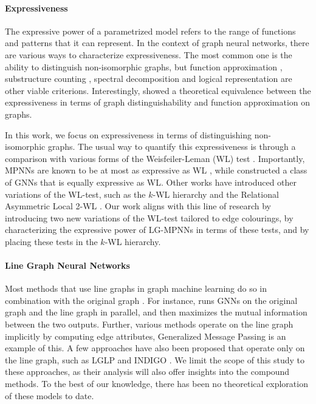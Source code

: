 \documentclass{article}
\begin{document}
\paragraph{Expressiveness}
The expressive power of a parametrized model refers to the range of functions and patterns that it can represent. 
In the context of graph neural networks, there are various ways to characterize expressiveness. The most common one is the ability to distinguish non-isomorphic graphs, but function approximation \cite{maron2019universality}, substructure counting \cite{chen2020can}, spectral decomposition \cite{balcilar2020analyzing} and logical representation \cite{barcelo2020logical} are other viable criterions. Interestingly, \cite{chen2019equivalence} showed a theoretical equivalence between the expressiveness in terms of graph distinguishability and function approximation on graphs.

In this work, we focus on expressiveness in terms of distinguishing non-isomorphic graphs.
The usual way to quantify this expressiveness is through a comparison with various forms of the Weisfeiler-Leman (WL) test \cite{weisfeiler1968reduction}. Importantly, MPNNs are known to be at most as expressive as WL \cite{morris2019weisfeiler}, while \cite{xu2018powerful} constructed a class of GNNs that is equally expressive as WL. Other works have introduced other variations of the WL-test, such as the $k$-WL hierarchy \cite{morris2019weisfeiler} and the Relational Asymmetric Local 2-WL \cite{huang2024theory}.
Our work aligns with this line of research by introducing two new variations of the WL-test tailored to edge colourings, by characterizing the expressive power of LG-MPNNs in terms of these tests, and by placing these tests in the $k$-WL hierarchy.



\paragraph{Line Graph Neural Networks}
Most methods that use line graphs in graph machine learning do so in combination with the original graph \cite{choudhary2021atomistic,chen2017supervised,jiang2019censnet,zhang2023line}. For instance, \cite{zhang2023line} runs GNNs on the original graph and the line graph in parallel, and then maximizes the mutual information between the two outputs.
Further, various methods operate on the line graph implicitly by computing edge attributes, 
Generalized Message Passing \cite{battaglia2018relational} is an example of this.
A few approaches have also been proposed that operate only on the line graph, such as LGLP \cite{cai2021line} and INDIGO \cite{liu2021indigo}.
We limit the scope of this study to these approaches, as their analysis will also offer insights into the compound methods. To the best of our knowledge, there has been no theoretical exploration of these models to date.
\end{document}
